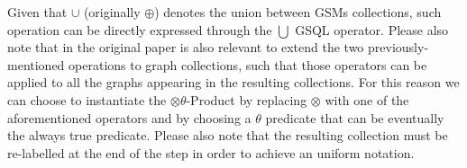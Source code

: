 Given that $\cup$ (originally $\oplus$) denotes the union between GSMs collections, such operation can be directly expressed through the $\bigcup$ GSQL operator.
Please also note that in the original paper is also relevant to extend the two previously-mentioned operations to graph collections, such that those operators can be applied to all the graphs appearing in the resulting collections. For this reason we can choose to instantiate the $\otimes\theta$-Product by replacing $\otimes$ with one of the aforementioned operators and by choosing a $\theta$ predicate that can be eventually the always true predicate. Please also note that the resulting collection must be re-labelled at the end of the step in order to achieve an uniform notation. 

